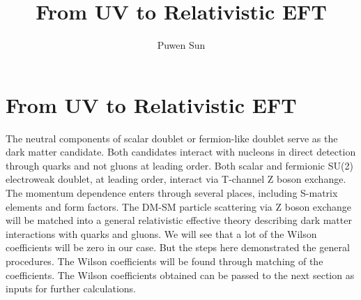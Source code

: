 \documentclass[12pt]{article}
\begin{document}
 


\title{From UV to Relativistic EFT}
\author{Puwen Sun}
\date{}
\maketitle


\section{From UV to Relativistic EFT}



The neutral components of scalar doublet or fermion-like doublet serve as the dark matter candidate. Both candidates interact with nucleons in direct detection through quarks and not gluons at leading order. 
Both scalar and fermionic SU(2) electroweak doublet, at leading order, interact via T-channel Z boson exchange. The momentum dependence enters through several places, including S-matrix elements and form factors. 
The DM-SM particle scattering via Z boson exchange will be matched into a general relativistic effective theory describing dark matter interactions with quarks and gluons. We will see that a lot of the Wilson coefficients will be zero in our case. But the steps here demonstrated the general procedures. The Wilson coefficients will be found through matching of the coefficients. The Wilson coefficients obtained can be passed to the next section as inputs for further calculations. 
\end{document}
